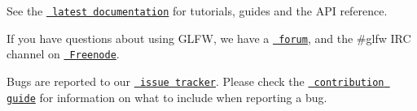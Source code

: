 See the \href{http://www.glfw.org/docs/latest/}{\texttt{ latest documentation}} for tutorials, guides and the API reference.

If you have questions about using GLFW, we have a \href{https://discourse.glfw.org/}{\texttt{ forum}}, and the {\ttfamily \#glfw} IRC channel on \href{http://freenode.net/}{\texttt{ Freenode}}.

Bugs are reported to our \href{https://github.com/glfw/glfw/issues}{\texttt{ issue tracker}}. Please check the \href{https://github.com/glfw/glfw/blob/master/docs/CONTRIBUTING.md}{\texttt{ contribution guide}} for information on what to include when reporting a bug. 
